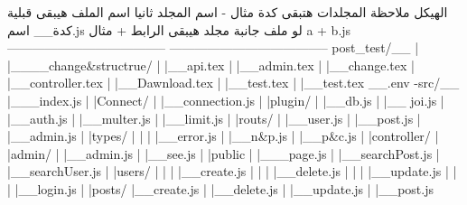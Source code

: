 الهيكل
ملاحظة المجلدات  هتبقى كدة مثال - اسم المجلد
ثانيا اسم الملف هيبقى قبلية كدة__ اسم.js
لو ملف جانبة مجلد هيبقى الرابط + مثال
 a + b.js
--------------------------------------
--------------------------------------
post_test/__
            |
            |____change&structrue/
               |         |__api.tex
               |         |__admin.tex
               |         |__change.tex
               |         |__controller.tex
               |         |__Dawnload.tex
               |         |__test.tex
               |         |__test.tex
            __.env       
            -src/__           
                  |___index.js 
                  |
                  |Connect/
                  |	|__connection.js  
                  |    
                  |plugin/
                  |   |__db.js  
                  |   |__ joi.js 
                  |   |__auth.js
                  |   |__multer.js 
                  |   |__limit.js 
                  |   
                  |routs/
                  |     |__user.js
                  |     |__post.js
                  |     |__admin.js
                  |
                  |types/
                  |     |
                  |     |__error.js
                  |     |__n&p.js
                  |     |__p&c.js
                  |
                  |controller/  
                        |     
                        |admin/
                        |   |__admin.js 
                        |   |__see.js
                        | 
                        |public
                        |   |___page.js
                        |   |__searchPost.js
                        |   |__searchUser.js
                        |   
                        |users/
                        |   |
                        |   |__create.js
                        |   |
                        |   |__delete.js    
                        |   |
                        |   |__update.js
                        |   |
                        |   |__login.js
                        |   
                        |posts/    
                              |__create.js
                              |
                              |__delete.js
                              |
                              |__update.js
                              |
                              |__post.js
